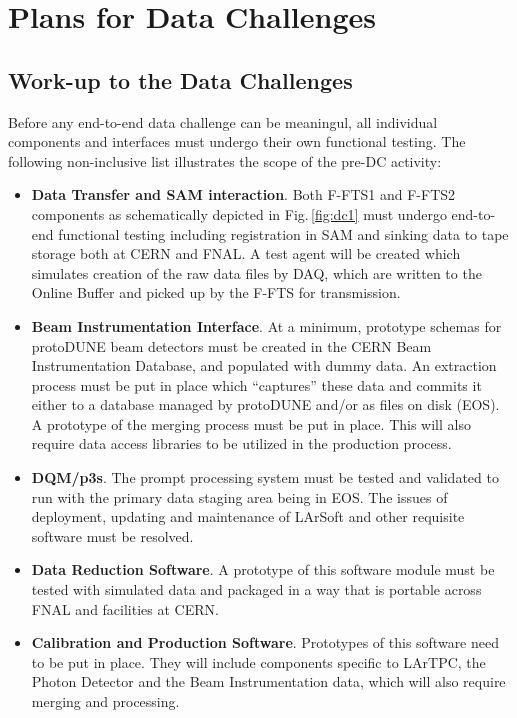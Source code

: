 \documentclass[pdftex,12pt,letter]{article}
\newcommand{\pd}{protoDUNE\xspace}
\begin{document}
\section{Plans for Data Challenges}
\subsection{Work-up to the Data Challenges}
Before any end-to-end data challenge can be meaningul, all individual components and interfaces must undergo
their own functional testing. The following non-inclusive list illustrates the scope of the pre-DC activity:
\begin{itemize}

\item \textbf{Data Transfer and SAM interaction}.  Both F-FTS1 and F-FTS2 components as schematically depicted in Fig.\,\ref{fig:dc1}
must undergo end-to-end functional testing including registration in SAM and sinking data to tape storage both at CERN and FNAL. A test
agent will be created which simulates creation of the raw data files by DAQ, which are written to the Online Buffer and picked up
by the F-FTS for transmission.

\item \textbf{Beam Instrumentation Interface}. At a minimum, prototype schemas for \pd beam detectors must be created in
the CERN Beam Instrumentation Database, and populated with dummy data. An extraction process must be put in place which
``captures'' these data and commits it either to a database managed by \pd and/or as files on disk (EOS). A prototype
of the merging process must be put in place. This will also require data access libraries to be utilized in the production process.

\item  \textbf{DQM/p3s}. The prompt processing system must be tested and validated to run with the primary data
staging area being in EOS. The issues of deployment, updating and maintenance of LArSoft and other requisite software
must be resolved.

\item  \textbf{Data Reduction Software}.
A prototype of this software module must be tested with simulated data and packaged in a way that is portable across
FNAL and facilities at CERN.

\item  \textbf{Calibration and Production Software}. Prototypes of this software need to be put in place. They will
include components specific to LArTPC, the Photon Detector and the Beam Instrumentation data, which will also require
merging and processing.


\end{itemize}
\end{document}
